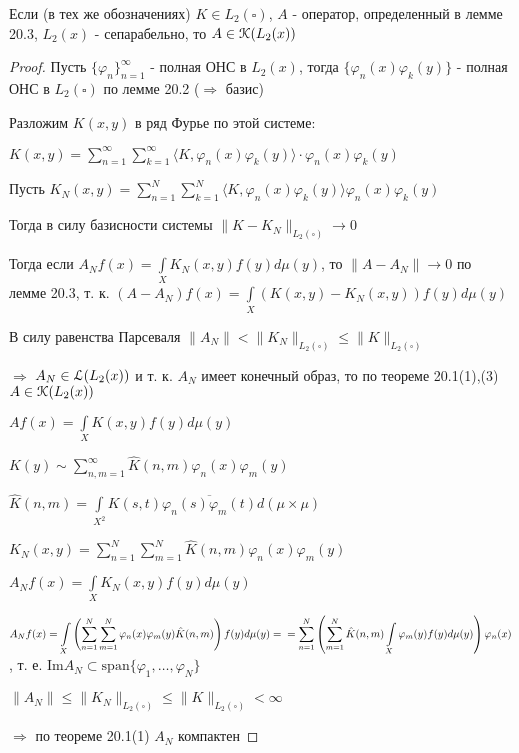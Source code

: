 \documentclass[a4paper,12pt]{report}
\begin{document}
\begin{thm}
Если (в тех же обозначениях) $K\in L_2(\square)$, $A$ - оператор, определенный в лемме 20.3, $L_2(x)$ - сепарабельно, то $A\in\EuScript K(L_2(x))$
\end{thm}
\begin{proof}
Пусть $\{\varphi_n\}_{n=1}^\infty$ - полная ОНС в $L_2(x)$, тогда $\{\varphi_n(x)\varphi_k(y)\}$ - полная ОНС в $L_2(\square)$ по лемме 20.2 ($\Rightarrow$ базис)

Разложим $K(x,y)$ в ряд Фурье по этой системе: 

$K(x,y)=\sum\limits_{n=1}^\infty\sum\limits_{k=1}^\infty\langle K,\varphi_n(x)\varphi_k(y)\rangle\cdot\varphi_n(x)\varphi_k(y)$

Пусть $K_N(x,y)=\sum\limits_{n=1}^N\sum\limits_{k=1}^N\langle K,\varphi_n(x)\varphi_k(y)\rangle\varphi_n(x)\varphi_k(y)$

Тогда в силу базисности системы $\|K-K_N\|_{L_2(\square)}\to0$

Тогда если $A_N f(x)=\displaystyle\int\limits_X K_N(x,y)f(y)d\mu(y)$, то $\|A-A_N\|\to0$ по лемме 20.3, т. к. $(A-A_N)f(x)=\displaystyle\int\limits_X\left(K(x,y)-K_N(x,y)\right)f(y)d\mu(y)$

В силу равенства Парсеваля $\|A_N\|<\|K_N\|_{L_2(\square)}\le\|K\|_{L_2(\square)}$ 

$\Rightarrow$ $A_N\in\EuScript L(L_2(x))$ и т. к. $A_N$ имеет конечный образ, то по теореме 20.1(1),(3) $A\in\EuScript K(L_2(x))$

$Af(x)=\displaystyle\int\limits_X K(x,y)f(y)d\mu(y)$

$K(y)\sim\sum\limits_{n,m=1}^\infty\hat K(n,m)\varphi_n(x)\varphi_m(y)$

$\hat K(n,m)=\displaystyle\int\limits_{X^2}K(s,t)\overline{\varphi_n(s)\varphi_m(t)}d(\mu\times\mu)$

$K_N(x,y)=\sum\limits_{n=1}^N\sum\limits_{m=1}^N\hat K(n,m)\varphi_n(x)\varphi_m(y)$

$A_N f(x)=\displaystyle\int\limits_X K_N(x,y)f(y)d\mu(y)$

$A_N f(x)=\displaystyle\int\limits_X\left(\sum\limits_{n=1}^N\sum\limits_{m=1}^N\varphi_n(x)\varphi_m(y)\hat K(n,m)\right)f(y)d\mu(y)=\\=\sum\limits_{n=1}^N\left(\sum\limits_{m=1}^N\hat K(n,m)\displaystyle\int\limits_X\varphi_m(y)f(y)d\mu(y)\right)\varphi_n(x)$, т. е. $\mathrm{Im}A_N\subset\mathrm{span}\{\varphi_1,\ldots,\varphi_N\}$

$\|A_N\|\le\|K_N\|_{L_2(\square)}\le\|K\|_{L_2(\square)}<\infty$

$\Rightarrow$ по теореме 20.1(1) $A_N$ компактен
\end{proof}
\bigskip\bigskip\bigskip
\end{document}
